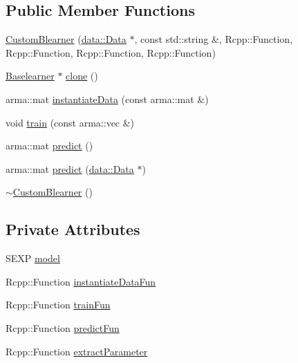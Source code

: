 \subsection*{Public Member Functions}
\begin{DoxyCompactItemize}
\item 
\hyperlink{classblearner_1_1_custom_blearner_a99b05f69e8d3cacfab556b6a5310f50a}{Custom\+Blearner} (\hyperlink{classdata_1_1_data}{data\+::\+Data} $\ast$, const std\+::string \&, Rcpp\+::\+Function, Rcpp\+::\+Function, Rcpp\+::\+Function, Rcpp\+::\+Function)
\item 
\hyperlink{classblearner_1_1_baselearner}{Baselearner} $\ast$ \hyperlink{classblearner_1_1_custom_blearner_a7ceeee2b7fffd11f376018bc1d3cfba1}{clone} ()
\item 
arma\+::mat \hyperlink{classblearner_1_1_custom_blearner_a18971368219f6948456b8e60c20b6968}{instantiate\+Data} (const arma\+::mat \&)
\item 
void \hyperlink{classblearner_1_1_custom_blearner_a4726c5b861b67817f7b3eb61d8f6c0d7}{train} (const arma\+::vec \&)
\item 
arma\+::mat \hyperlink{classblearner_1_1_custom_blearner_a20b5fe06512aa73478b9f934e1c81c31}{predict} ()
\item 
arma\+::mat \hyperlink{classblearner_1_1_custom_blearner_a401a479834eb3896260cb57b4551ceb4}{predict} (\hyperlink{classdata_1_1_data}{data\+::\+Data} $\ast$)
\item 
\hyperlink{classblearner_1_1_custom_blearner_ada8c7351aa50e8149dfd546840c51f51}{$\sim$\+Custom\+Blearner} ()
\end{DoxyCompactItemize}
\subsection*{Private Attributes}
\begin{DoxyCompactItemize}
\item 
S\+E\+XP \hyperlink{classblearner_1_1_custom_blearner_a7e802c5c67838d6d5a411f26a536d657}{model}
\item 
Rcpp\+::\+Function \hyperlink{classblearner_1_1_custom_blearner_a97bbb549bc85799ec40d3a67cb204222}{instantiate\+Data\+Fun}
\item 
Rcpp\+::\+Function \hyperlink{classblearner_1_1_custom_blearner_a59f400a2816f5d0a3488a9a9179c1e05}{train\+Fun}
\item 
Rcpp\+::\+Function \hyperlink{classblearner_1_1_custom_blearner_a377ecf33cffd26e1079407be20a8b2c5}{predict\+Fun}
\item 
Rcpp\+::\+Function \hyperlink{classblearner_1_1_custom_blearner_a95a77720324a16190f84612ea0c0e812}{extract\+Parameter}
\end{DoxyCompactItemize}
